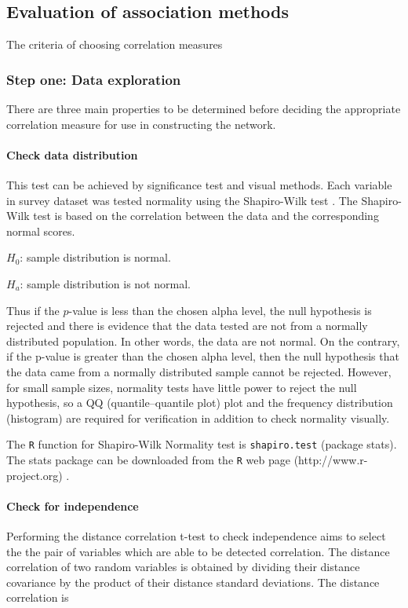 \documentclass[a4paper]{article}
\begin{document}
\subsection*{Evaluation of association methods}
The criteria of choosing correlation measures 
\subsubsection*{Step one: Data exploration}
There are three main properties to be determined before deciding the appropriate correlation measure for use in constructing the network. 

\paragraph{Check data distribution} This test can be achieved by significance test and visual methods. Each variable in survey dataset was tested normality using the Shapiro-Wilk test \citep{ghasemi2012normality}. The Shapiro-Wilk test is based on the correlation between the data and the corresponding normal scores.

$H_{0}$: sample distribution is normal.

$H_{a}$: sample distribution is not normal.

Thus if the $p$-value is less than the chosen alpha level, the null hypothesis is rejected and there is evidence that the data tested are not from a normally distributed population. In other words, the data are not normal. On the contrary, if the p-value is greater than the chosen alpha level, then the null hypothesis that the data came from a normally distributed sample   cannot be rejected. However, for small sample sizes, normality tests have little power to reject the null hypothesis, so a QQ (quantile--quantile plot) plot and the frequency distribution (histogram) are required for verification in addition to check normality visually.

The \texttt{R} function for Shapiro-Wilk Normality test is \texttt{shapiro.test} (package stats). The stats package can be downloaded from the \texttt{R} web page (http://www.r-project.org) \citep{R:2014}.

\paragraph{Check for independence} Performing the distance correlation t-test\citep{szekely2007measuring} to check independence aims to select the the pair of variables which are able to be detected correlation. The distance correlation of two random variables is obtained by dividing their distance covariance by the product of their distance standard deviations. The distance correlation is
\end{document}
